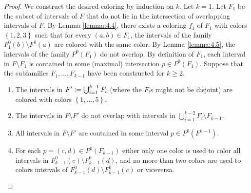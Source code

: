 \documentclass[12pt]{article}
\theoremstyle{definition}
\newcommand{\defeq}{\vcentcolon=}
\begin{document}
    \begin{proof}
        We construct the desired
        coloring by induction
        on $k$.
        Let $k = 1$.
        Let $F_1$ be the subset
        of intervals of $F$ that 
        do not lie in the intersection
        of overlapping intervals of $F$.
        By Lemma \ref{lemma:4.4},
        there exists a coloring
        $f_1$ of $F_1$ with colors
        $\left\{1,2,3\right\}$ such
        that for every $\left(a,b\right)
        \in F_1$, the intervals
        of the family $F^{0}_{1}
        \left(b\right) \setminus F^{0}\left(a\right)$
        are colored with the same
        color.
        By Lemma \ref{lemma:4.5},
        the intervals of the family
        $P^{0}\left(F_1\right)$ 
        do not overlap. By definition
        of $F_1$, each interval in 
        $F \setminus F_1$ is contained
        in some (maximal) intersection
        $p \in P^{0}\left(F_1\right)$.
        Suppose that the subfamilies
        $F_1, \ldots, F_{k-1}$ have
        been constructed for
        $k \geq 2$.
        \begin{enumerate}
            \item The intervals in
                $F' \defeq 
                \bigcup_{i=1}^{k-1} F_{i}$
                (where the $F_{i}$s
                might not be disjoint)
                are colored with colors
                $\left\{1, \ldots, 5\right\}$.
            \item The intervals in
                $F \setminus F'$ do not
                overlap with intervals
                in $\bigcup_{i=1}^{k-2}
                F_{i} \setminus F_{k-1}$.
                \label{cond:2}
            \item \label{cond:3} All intervals in 
                $F \setminus F'$ 
                are contained in some 
                interval $p \in 
                P^{0}\left(F^{k-1}\right)$.
            \item For each $p =
                \left(c, d\right) \in 
                P^{0}\left(F_{k-1}\right)$ 
                either only one
                color is used to color
                all intervals in 
                $F^{0}_{k-1}\left(c\right) 
                \setminus F^{0}_{k-1}\left(d\right)$,
                and no more than 
                two colors are used to 
                colors intervals
                of $F^{0}_{k-1}\left(d\right)
                \setminus F^{0}_{k-1}\left(c\right)$
                or viceversa.
        \end{enumerate}

\end{proof}
\end{document}
